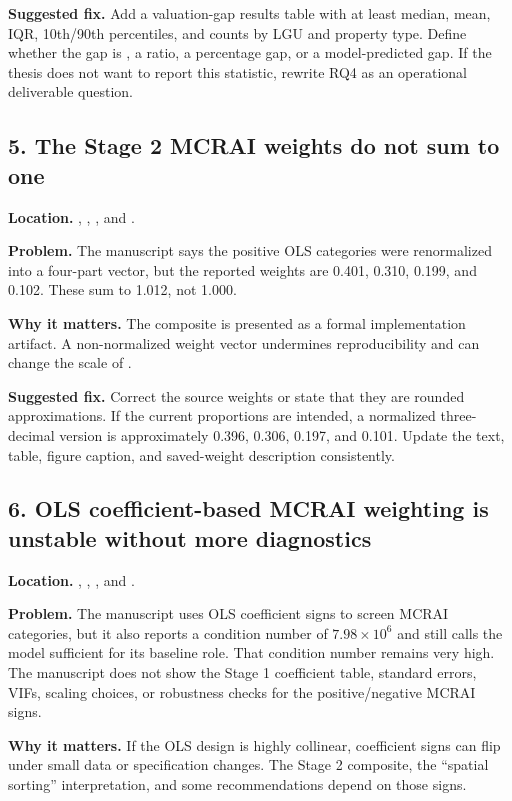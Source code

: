 \documentclass[11pt]{article}
\begin{document}
\textbf{Suggested fix.} Add a valuation-gap results table with at least median, mean, IQR, 10th/90th percentiles, and counts by LGU and property type. Define whether the gap is , a ratio, a percentage gap, or a model-predicted gap. If the thesis does not want to report this statistic, rewrite RQ4 as an operational deliverable question.

\subsection*{5. The Stage 2 MCRAI weights do not sum to one}

\textbf{Location.} , , , and .

\textbf{Problem.} The manuscript says the positive OLS categories were renormalized into a four-part vector, but the reported weights are 0.401, 0.310, 0.199, and 0.102. These sum to 1.012, not 1.000.

\textbf{Why it matters.} The composite is presented as a formal implementation artifact. A non-normalized weight vector undermines reproducibility and can change the scale of .

\textbf{Suggested fix.} Correct the source weights or state that they are rounded approximations. If the current proportions are intended, a normalized three-decimal version is approximately 0.396, 0.306, 0.197, and 0.101. Update the text, table, figure caption, and saved-weight description consistently.

\subsection*{6. OLS coefficient-based MCRAI weighting is unstable without more diagnostics}

\textbf{Location.} , , , and .

\textbf{Problem.} The manuscript uses OLS coefficient signs to screen MCRAI categories, but it also reports a condition number of $7.98 \times 10^6$ and still calls the model sufficient for its baseline role. That condition number remains very high. The manuscript does not show the Stage 1 coefficient table, standard errors, VIFs, scaling choices, or robustness checks for the positive/negative MCRAI signs.

\textbf{Why it matters.} If the OLS design is highly collinear, coefficient signs can flip under small data or specification changes. The Stage 2 composite, the ``spatial sorting'' interpretation, and some recommendations depend on those signs.
\end{document}
